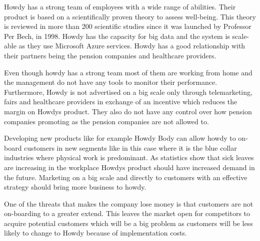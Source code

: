 \noindent Howdy has a strong team of employees with a wide range of abilities. Their product is based on a scientifically proven theory to assess well-being. This theory is reviewed in more than 200 scientific studies since it was launched by Professor Per Bech, in 1998. Howdy has the capacity for big data and the system is scale-able as they use Microsoft Azure services. Howdy has a good relationship with their partners being the pension companies and healthcare providers.

\noindent Even though howdy has a strong team most of them are working from home and the management do not have any tools to monitor their performance. Furthermore, Howdy is not advertised on a big scale only through telemarketing, fairs and healthcare providers in exchange of an incentive which reduces the margin on Howdys product. They also do not have any control over how pension companies promoting as the pension companies are not allowed to.

\noindent Developing new products like for example Howdy Body can allow howdy to on-board customers in new segments like in this case where it is the blue collar industries where physical work is predominant. As statistics show that sick leaves are increasing in the workplace Howdys product should have increased demand in the future. Marketing on a big scale and directly to customers with an effective strategy should bring more business to howdy.

\noindent One of the threats that makes the company lose money is that customers are not on-boarding to a greater extend. This leaves the market open for competitors to acquire potential customers which will be a big problem as customers will be less likely to change to Howdy because of implementation costs.



